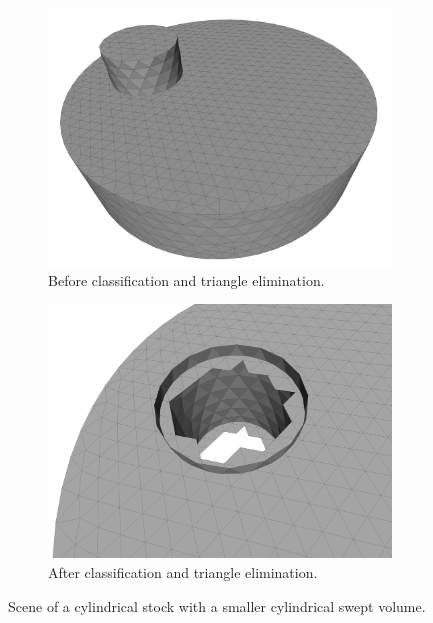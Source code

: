 \begin{figure}[H]
	\centering
	\begin{subfigure}[b]{0.4\textwidth}
		\centering
		\includegraphics[width=\textwidth]{images/cylinders_classification_before}
		\caption{
			Before classification and triangle elimination.
		}
		\label{fig:cylinders_classification_before}
	\end{subfigure}
	\begin{subfigure}[b]{0.4\textwidth}
		\centering
		\includegraphics[width=\textwidth]{images/cylinders_classification_after}
		\caption{
			After classification and triangle elimination.
		}
		\label{fig:cylinders_classification_after}
	\end{subfigure}
	\caption{
		Scene of a cylindrical stock with a smaller cylindrical swept volume.
	}
	\label{fig:cylinders_classification}
\end{figure}


